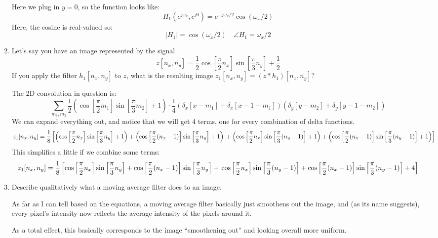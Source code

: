 \documentclass[10pt]{article}
\begin{document}
\begin{enumerate}[label=\alph*)]
			\begin{solution}
				Here we plug in \( y = 0 \), so the function looks like:
				\[
				H_1(e^{j \omega_x}, e^{j 0}) = e^{-j \omega_x / 2}\cos(\omega_x / 2)
				\] 
				Here, the cosine is real-valued so:
				\[
				|H_1| = \cos(\omega_x / 2) \quad \angle H_1 = \omega_x / 2
				\] 
			\end{solution}
		\item Let's say you have an image represented by the signal
			\[
				z[n_x, n_y] = \frac{1}{2}\cos\left[ \frac{\pi}{2}n_x \right] \sin\left[ \frac{\pi}{3}n_y \right] 
				+ \frac{1}{2}
			\] 
			If you apply the filter \( h_1[n_x, n_y] \) to \( z \), what is the resulting image 
			\( z_1[n_x, n_y] = (z * h_1)[n_x, n_y] \)?

			\begin{solution}
				The 2D convolution in question is:
				\[
					\sum_{m_1, m_2} \frac{1}{2}\left( \cos \left[ \frac{\pi}{2}m_1 \right] \sin\left[ \frac{\pi}{3}m_2 \right] + 1 \right) \cdot \frac{1}{4}(\delta_x [x - m_1] + \delta_x[x - 1 - m_1])(\delta_y[y - m_2] + \delta_y[y - 1 - m_2])
				\] 
				We can expand everything out, and notice that we will get 4 terms, one for every combination of 
				delta functions. 
				\begin{dmath*}
					z_1[n_x, n_y] = \frac{1}{8}\left[
						 \left(\cos\left[ \frac{\pi}{2}n_x \right] \sin\left[ \frac{\pi}{3}n_y \right] + 1\right) 
						+ \left( \cos\left[ \frac{\pi}{2}(n_x -1) \right] \sin\left[ \frac{\pi}{3}n_y \right] + 1 \right) \\
						+ \left( \cos\left[ \frac{\pi}{2}n_x \right] \sin\left[ \frac{\pi}{3}(n_y - 1) \right] + 1 \right) 
						+ \left( \cos\left[ \frac{\pi}{2}(n_x - 1) \right] \sin\left[ \frac{\pi}{3}(n_y - 1) \right] + 1 \right) \right]
				\end{dmath*}
				This simplifies a little if we combine some terms:
				\begin{dmath*}
					z_1[n_x, n_y] = \frac{1}{8}\left[ \cos \left[ \frac{\pi}{2}n_x \right] 
					\sin\left[ \frac{\pi}{3}n_y \right] + \cos\left[ \frac{\pi}{2}(n_x - 1) \right] 
				\sin \left[ \frac{\pi}{3}n_y \right] + \\ \cos\left[ \frac{\pi}{2}n_x \right] 
			\sin\left[ \frac{\pi}{3}(n_y - 1) \right] + 
		\cos\left[ \frac{\pi}{2}(n_x - 1) \right] \sin\left[ \frac{\pi}{3}(n_y - 1) \right] + 4\right] 
			\end{dmath*}
			\end{solution}
		\item Describe qualitatively what a moving average filter does to an image. 

			\begin{solution}
				As far as I can tell based on the equations, a moving average filter basically just smoothens 
				out the image, and (as its name suggests), every pixel's intensity now reflects the average 
				intensity of the pixels around it. 

				As a total effect, this basically corresponds to the image ``smoothening out'' and looking overall 
				more uniform.
			\end{solution}
	\end{enumerate}
	\pagebreak
\end{document}
